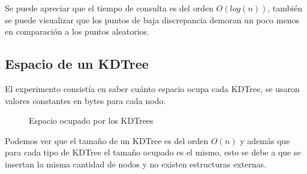 \documentclass[12pt,letterpaper, margin = 3cm]{article}
\begin{document}
Se puede apreciar que el tiempo de consulta es del orden $O(log(n))$, también se puede visualizar que los puntos de baja discrepancia demoran un poco menos en comparación a los puntos aleatorios.

\newpage
\subsection{ Espacio de un KDTree} 
El experimento consistía en saber cuánto espacio ocupa cada KDTree, se usaron valores constantes en bytes para cada nodo. 

\begin{figure}[ht!]
 \centering
{}
 \caption{Espacio ocupado por los KDTrees}
\end{figure}

Podemos ver que el tamaño de un KDTree es del orden $O(n)$ y además que para cada tipo de KDTree el tamaño ocupado es el mismo, esto se debe a que se insertan la misma cantidad de nodos y no existen estructuras externas.



\newpage
\end{document}
